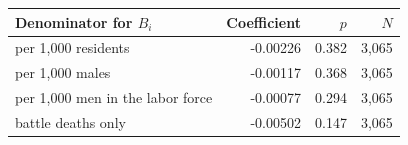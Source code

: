 \begin{tabular}{lrrr}
\toprule
Denominator for $B_i$ & Coefficient & $p$ & $N$ \\
\midrule
per 1,000 residents & -0.00226 & 0.382 & 3,065 \\
per 1,000 males & -0.00117 & 0.368 & 3,065 \\
per 1,000 men in the labor force & -0.00077 & 0.294 & 3,065 \\
battle deaths only & -0.00502 & 0.147 & 3,065 \\
\bottomrule
\end{tabular}